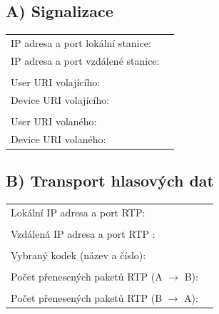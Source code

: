   \subsection*{A) Signalizace}
  \begin{tabular}{lp{2cm}}
    IP adresa a port lokální stanice: &\\
    IP adresa a port vzdálené stanice: &\\
    &\\
    User URI volajícího: &\\
    Device URI volajícího: &\\
    &\\
    User URI volaného: &\\
    Device URI volaného: &\\
  \end{tabular}               

  \subsection*{B) Transport hlasových dat}
  \begin{tabular}{lp{2cm}}
    Lokální IP adresa a port RTP: &\\
    &\\
    Vzdálená IP adresa a port RTP : &\\
    &\\
    Vybraný kodek (název a číslo): &\\
    &\\
    Počet přenesených paketů RTP (A $\rightarrow$ B): &\\
    &\\
    Počet přenesených paketů RTP (B $\rightarrow$ A): &\\
\end{tabular}               
